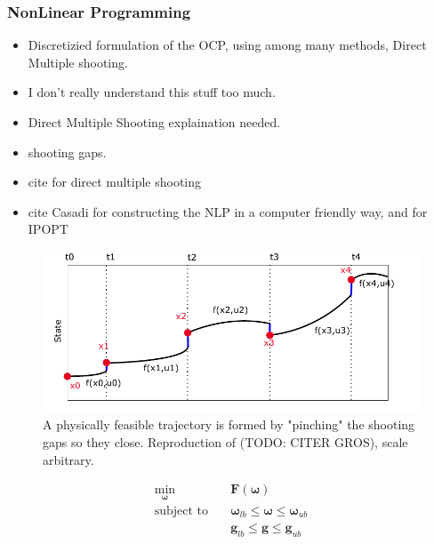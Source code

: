 \subsubsection*{NonLinear Programming}
\begin{itemize}
    \item Discretizied formulation of the OCP, using among many methods, Direct Multiple shooting.
    \item I don't really understand this stuff too much.
    \item Direct Multiple Shooting explaination needed.
    \item shooting gaps.
    \item cite \cite{gros2017Lecture} for direct multiple shooting
    \item cite \cite{andersson2019casadi} Casadi for constructing the NLP in a 
    computer friendly way, and \cite{wachter2006implementation} for IPOPT
\end{itemize}

\begin{figure}
    \includegraphics[width=\textwidth]{Images/MultipleShooting.pdf}
    \caption{A physically feasible trajectory is formed by "pinching" the shooting gaps so they close. Reproduction of (TODO: CITER GROS), scale arbitrary.}
    \label{FIG: Shooting Gaps}
\end{figure}

\begin{subequations}
    \label{EQ:NLP}
    \begin{align}
        \min_{\boldsymbol{\omega}} \quad & \textbf{F}(\boldsymbol{\omega}) \label{eq:NLP-1} \\
        \textrm{subject to} \quad & \boldsymbol{\omega}_{lb} \leq \boldsymbol{\omega} \leq \boldsymbol{\omega}_{ub} \\ 
        \quad & \textbf{g}_{lb} \leq \textbf{g} \leq \textbf{g}_{ub}
    \end{align}
\end{subequations}

